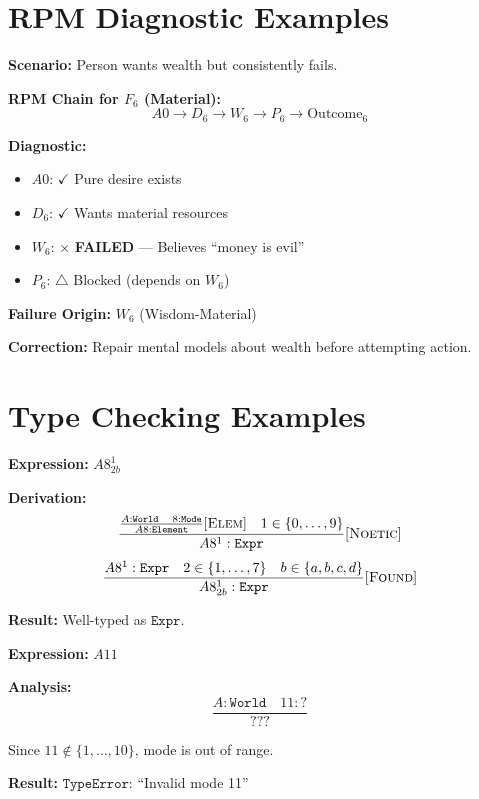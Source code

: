 \section{RPM Diagnostic Examples}

\begin{example}
\label{ex:wealth-failure}
\textbf{Scenario:} Person wants wealth but consistently fails.

\textbf{RPM Chain for $F_6$ (Material):}
\[
A0 \to D_6 \to W_6 \to P_6 \to \mathrm{Outcome}_6
\]

\textbf{Diagnostic:}
\begin{itemize}
  \item $A0$: $\checkmark$ Pure desire exists
  \item $D_6$: $\checkmark$ Wants material resources
  \item $W_6$: $\times$ \textbf{FAILED} --- Believes ``money is evil''
  \item $P_6$: $\triangle$ Blocked (depends on $W_6$)
\end{itemize}

\textbf{Failure Origin:} $W_6$ (Wisdom-Material)

\textbf{Correction:} Repair mental models about wealth before attempting action.
\end{example}

\section{Type Checking Examples}

\begin{example}
\label{ex:welltyped}
\textbf{Expression:} $A8^1_{2b}$

\textbf{Derivation:}
\[
\frac{
  \frac{A : \mathtt{World} \quad 8 : \mathtt{Mode}}{A8 : \mathtt{Element}} [\textsc{Elem}]
  \quad 1 \in \{0,\ldots,9\}
}{A8^1 : \mathtt{Expr}} [\textsc{Noetic}]
\]
\[
\frac{A8^1 : \mathtt{Expr} \quad 2 \in \{1,\ldots,7\} \quad b \in \{a,b,c,d\}}{A8^1_{2b} : \mathtt{Expr}} [\textsc{Found}]
\]

\textbf{Result:} Well-typed as $\mathtt{Expr}$.
\end{example}

\begin{example}
\label{ex:illtyped}
\textbf{Expression:} $A11$

\textbf{Analysis:}
\[
\frac{A : \mathtt{World} \quad 11 : ?}{???}
\]

Since $11 \notin \{1,\ldots,10\}$, mode is out of range.

\textbf{Result:} $\mathtt{TypeError}$: ``Invalid mode 11''
\end{example}


